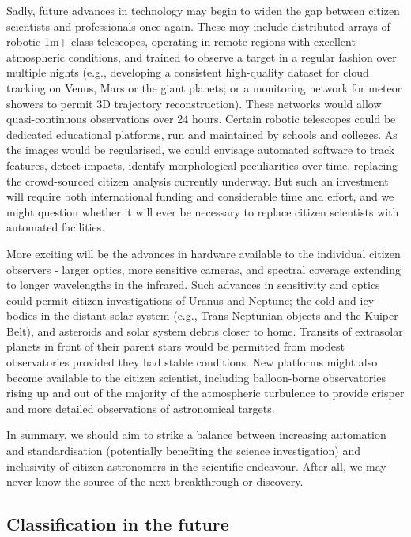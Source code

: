 \documentclass{ar2e}
\begin{document}
Sadly, future advances in technology may begin to widen the gap between
citizen scientists and professionals once again. These may include distributed
arrays of robotic 1m+ class telescopes, operating in remote regions with
excellent atmospheric conditions, and trained to observe a target in a regular
fashion over multiple nights (e.g., developing a consistent high-quality
dataset for cloud tracking on Venus, Mars or the giant planets; or a
monitoring network for meteor showers to permit 3D trajectory
reconstruction).  These networks would allow quasi-continuous observations
over 24 hours.  Certain robotic telescopes could be dedicated educational
platforms, run and maintained by schools and colleges.  As the images would be
regularised, we could envisage automated software to track features, detect
impacts, identify morphological peculiarities over time, replacing the
crowd-sourced citizen analysis currently underway.  But such an investment
will require both international funding and considerable time and effort, and
we might question whether it will ever be necessary to replace citizen
scientists with automated facilities.

More exciting will be the advances in hardware available to the individual
citizen observers - larger optics, more sensitive cameras, and spectral
coverage extending to longer wavelengths in the infrared.  Such advances in
sensitivity and optics could permit citizen investigations of Uranus and
Neptune; the cold and icy bodies in the distant solar system (e.g.,
Trans-Neptunian objects and the Kuiper Belt), and asteroids and solar system
debris closer to home.  Transits of extrasolar planets in front of their
parent stars would be permitted from modest observatories provided they had
stable conditions.  New platforms might also become available to the citizen
scientist, including balloon-borne observatories rising up and out of the
majority of the atmospheric turbulence to provide crisper and more detailed
observations of astronomical targets. 

In summary, we should aim to strike a balance between increasing automation
and standardisation (potentially benefiting the science investigation) and
inclusivity of citizen astronomers in the scientific endeavour.  After all, we
may never know the source of the next breakthrough or discovery.




\subsection{Classification in the future}
\label{sec:future:class}
\end{document}
